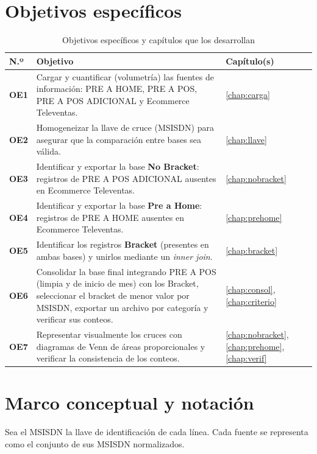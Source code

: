\documentclass[11pt,a4paper,oneside]{book}
\newcommand{\hd}[1]{\sffamily\bfseries\color{white}#1}
\newcommand{\tablehead}{\rowcolor{navy}}
\begin{document}
\section{Objetivos específicos}
\begin{table}[H]
\centering
\caption{Objetivos específicos y capítulos que los desarrollan}\label{tab:objetivos}
\small
\begin{tabularx}{\textwidth}{@{}>{\sffamily\bfseries\color{navy}}p{1.2cm}Xp{2.2cm}@{}}
\toprule
\tablehead \hd{N.º} & \hd{Objetivo} & \hd{Capítulo(s)}\\
\midrule
OE1 & Cargar y cuantificar (volumetría) las fuentes de información: PRE A HOME, PRE A POS, PRE A POS ADICIONAL y Ecommerce Televentas. & \ref{chap:carga} \\
OE2 & Homogeneizar la llave de cruce (MSISDN) para asegurar que la comparación entre bases sea válida. & \ref{chap:llave} \\
OE3 & Identificar y exportar la base \textbf{No Bracket}: registros de PRE A POS ADICIONAL ausentes en Ecommerce Televentas. & \ref{chap:nobracket} \\
OE4 & Identificar y exportar la base \textbf{Pre a Home}: registros de PRE A HOME ausentes en Ecommerce Televentas. & \ref{chap:prehome} \\
OE5 & Identificar los registros \textbf{Bracket} (presentes en ambas bases) y unirlos mediante un \emph{inner join}. & \ref{chap:bracket} \\
OE6 & Consolidar la base final integrando PRE A POS (limpia y de inicio de mes) con los Bracket, seleccionar el bracket de menor valor por MSISDN, exportar un archivo por categoría y verificar sus conteos. & \ref{chap:consol}, \ref{chap:criterio} \\
OE7 & Representar visualmente los cruces con diagramas de Venn de áreas proporcionales y verificar la consistencia de los conteos. & \ref{chap:nobracket}, \ref{chap:prehome}, \ref{chap:verif} \\
\bottomrule
\end{tabularx}
\end{table}

\section{Marco conceptual y notación}
Sea el MSISDN la llave de identificación de cada línea. Cada fuente se representa como el conjunto de sus MSISDN normalizados.
\end{document}
